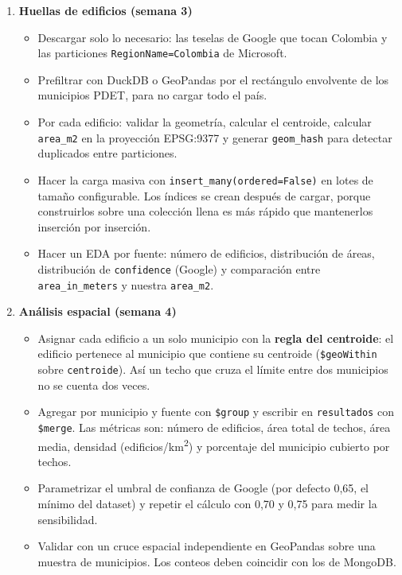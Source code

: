 \documentclass[11pt,a4paper]{article}
\newcommand{\campo}[1]{\texttt{#1}}
\begin{document}
\begin{enumerate}[leftmargin=*]
  \item \textbf{Huellas de edificios (semana 3)}
  \begin{itemize}
    \item Descargar solo lo necesario: las teselas de Google que tocan
          Colombia y las particiones \campo{RegionName=Colombia} de Microsoft.
    \item Prefiltrar con DuckDB o GeoPandas por el rectángulo envolvente de
          los municipios PDET, para no cargar todo el país.
    \item Por cada edificio: validar la geometría, calcular el centroide,
          calcular \campo{area\_m2} en la proyección EPSG:9377 y generar
          \campo{geom\_hash}
          para detectar duplicados entre particiones.
    \item Hacer la carga masiva con \campo{insert\_many(ordered=False)} en
          lotes de tamaño configurable. Los índices se crean después de
          cargar, porque construirlos sobre una colección llena es más rápido
          que mantenerlos inserción por inserción.
    \item Hacer un EDA por fuente: número de edificios, distribución de
          áreas, distribución de \campo{confidence} (Google) y comparación
          entre \campo{area\_in\_meters} y nuestra \campo{area\_m2}.
  \end{itemize}

  \item \textbf{Análisis espacial (semana 4)}
  \begin{itemize}
    \item Asignar cada edificio a un solo municipio con la \textbf{regla del
          centroide}: el edificio pertenece al municipio que contiene su
          centroide (\campo{\$geoWithin} sobre \campo{centroide}). Así un
          techo que cruza el límite entre dos municipios no se cuenta dos
          veces.
    \item Agregar por municipio y fuente con \campo{\$group} y escribir en
          \campo{resultados} con \campo{\$merge}. Las métricas son: número de
          edificios, área total de techos, área media, densidad
          (edificios/km\textsuperscript{2}) y porcentaje del municipio
          cubierto por techos.
    \item Parametrizar el umbral de confianza de Google (por defecto 0,65, el
          mínimo del dataset) y repetir el cálculo con 0,70 y 0,75 para medir
          la sensibilidad.
    \item Validar con un cruce espacial independiente en GeoPandas sobre una
          muestra de municipios. Los conteos deben coincidir con los de
          MongoDB.
  \end{itemize}


\end{enumerate}
\end{document}
